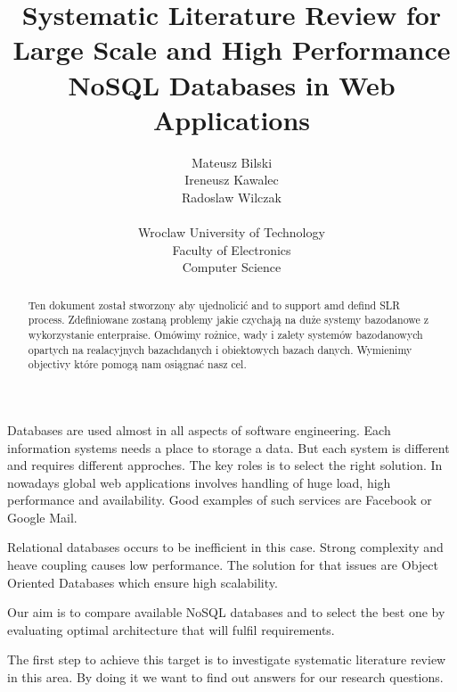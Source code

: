 \documentclass[times, 10pt,twocolumn]{article}
\begin{document}
\title{ Systematic Literature Review
       for Large Scale and High Performance NoSQL Databases in Web Applications}

\author{Mateusz Bilski\\ Ireneusz Kawalec \\ Radoslaw Wilczak\\ \\
Wroclaw University of Technology\\ Faculty of Electronics \\ Computer Science
}

\maketitle
\thispagestyle{empty}

\begin{abstract}

Ten dokument został stworzony aby ujednolicić and to support amd defind SLR process. 
Zdefiniowane zostaną problemy jakie czychają na duże systemy bazodanowe z wykorzystanie enterpraise.
Omówimy rożnice, wady i zalety systemów bazodanowych opartych na realacyjnych bazachdanych i obiektowych bazach danych.
Wymienimy objectivy które pomogą nam osiągnać nasz cel. 

\end{abstract}




Databases are used almost in all aspects of software engineering. Each 
information systems needs a place to storage a data. But each system is different
and requires different approches. The key roles is to select the right solution.
In nowadays global web applications involves handling of huge load, high performance and
availability. Good examples of such services are Facebook or Google Mail.

Relational databases occurs to be inefficient in this case. Strong complexity and
heave coupling causes low performance. The solution for that issues are Object Oriented
Databases which ensure high scalability.

Our aim is to compare available NoSQL databases and to select the best one by evaluating 
optimal architecture that will fulfil requirements. 

The first step to achieve this target is to investigate systematic literature review in this area.
By doing it we want to find out answers for our research questions.
\end{document}
